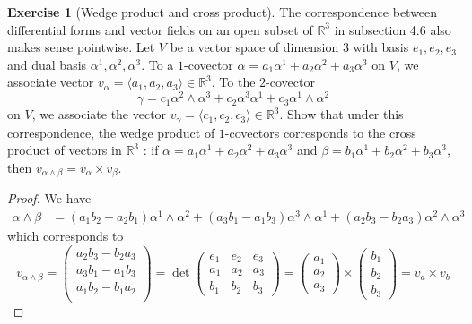 \documentclass[reqno]{amsart}
\theoremstyle{plain}%
\theoremstyle{definition}
\newtheorem{exercise}[theorem]{Exercise}
\theoremstyle{remark}
\begin{document}
\begin{exercise}[Wedge product and cross product]
    The correspondence between differential forms and
    vector fields on an open subset of $\mathbb{R}^3$ in
    subsection 4.6 also makes sense pointwise. Let
    $V$ be a vector space of dimension 3 with basis
    $e_1, e_2, e_3$ and dual basis $\alpha^1, \alpha^2, \alpha^3$.
    To a $1$-covector $\alpha = a_1 \alpha^1 + 
    a_2 \alpha^2 + a_3 \alpha^3$ on $V$, we associate vector
    $v_{\alpha} = \langle a_1, a_2, a_3 \rangle 
    \in \mathbb{R}^3$. To the $2$-covector
    \[
    \gamma = c_1 \alpha^2 \wedge \alpha^3 + c_2 \alpha^3 \alpha^1
    + c_3 \alpha^1 \wedge \alpha^2
    \] 
    on $V$, we associate the vector $v_{\gamma} =
    \langle c_1, c_2, c_3 \rangle \in \mathbb{R}^3$. Show that
    under this correspondence, the wedge product of
    $1$-covectors corresponds to the cross product of
    vectors in $\mathbb{R}^3$ : if
    $\alpha = a_1 \alpha^1 + a_2 \alpha^2 + a_3 \alpha^3$ and
    $\beta = b_1 \alpha^1 + b_2 \alpha^2 + b_3 \alpha^3$, then
    $v_{\alpha \wedge \beta} = 
    v_{\alpha} \times v_{\beta}$.
\end{exercise}

\begin{proof}
    We have
    \begin{align*}
        \alpha \wedge \beta
        &= \left( a_1 b_2 - a_2 b_1 \right) \alpha^1 \wedge
        \alpha^2 + \left( a_3 b_1 - a_1 b_3 \right) \alpha^3 \wedge
        \alpha^1 + \left( a_2 b_3 - b_2 a_3 \right) \alpha^2 \wedge
        \alpha^3
    \end{align*}
    which corresponds to
    \[
    v_{\alpha \wedge \beta} 
    =\begin{pmatrix} 
        a_2 b_3 - b_2 a_3 \\
        a_3 b_1 - a_1 b_3\\
        a_1 b_2 - b_1 a_2\\
    \end{pmatrix} 
    = \det 
    \begin{pmatrix} 
        e_1 & e_2 & e_3\\
        a_1 & a_2 & a_3\\
        b_1 & b_2 & b_3
    \end{pmatrix} 
    =
    \begin{pmatrix} 
        a_1\\
        a_2\\
        a_3
    \end{pmatrix} \times 
    \begin{pmatrix} 
        b_1 \\b_2 \\b_3
    \end{pmatrix} 
    = v_a \times v_b
    \] 
    
\end{proof}
\end{document}

